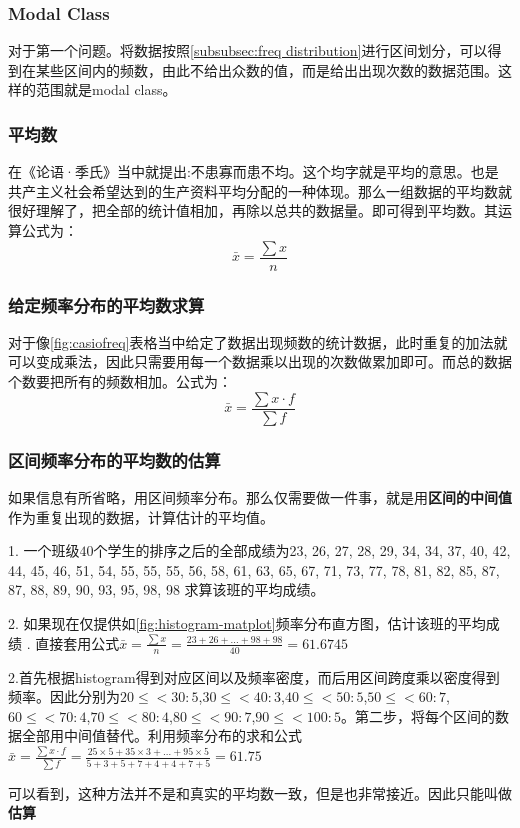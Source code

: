\subsubsection*{Modal Class}
对于第一个问题。将数据按照\ref{subsubsec:freq distribution}进行区间划分，可以得到在某些区间内的频数，由此不给出众数的值，而是给出出现次数的数据范围。这样的范围就是modal class。

\subsubsection*{平均数}
在《论语·季氏》当中就提出:不患寡而患不均。这个均字就是平均的意思。也是共产主义社会希望达到的生产资料平均分配的一种体现。那么一组数据的平均数就很好理解了，把全部的统计值相加，再除以总共的数据量。即可得到平均数。其运算公式为：
\[
    \bar{x} = \frac{\sum x}{n}
\]

\subsubsection*{给定频率分布的平均数求算}
对于像\ref{fig:casiofreq}表格当中给定了数据出现频数的统计数据，此时重复的加法就可以变成乘法，因此只需要用每一个数据乘以出现的次数做累加即可。而总的数据个数要把所有的频数相加。公式为：
\[
    \bar{x} = \frac{\sum x\cdot f}{\sum f}
\]

\subsubsection*{区间频率分布的平均数的\textbf{估算}}
如果信息有所省略，用区间频率分布。那么仅需要做一件事，就是用\textbf{区间的中间值}作为重复出现的数据，计算估计的平均值。
\begin{ExampleBox}
1. 一个班级$40$个学生的排序之后的全部成绩为23, 26, 27, 28, 29, 34, 34, 37, 40, 42, 44, 45, 46, 51, 54, 55, 55, 55, 56, 58, 61, 63, 65, 67, 71, 73, 77, 78, 81, 82, 85, 87, 87, 88, 89, 90, 93, 95, 98, 98
求算该班的平均成绩。

2. 如果现在仅提供如\ref{fig:histogram-matplot}频率分布直方图，估计该班的平均成绩
. 直接套用公式$\bar{x} = \frac{\sum x}{n} = \frac{23+26+\ldots+98+98}{40}=61.6745$

2.首先根据histogram得到对应区间以及频率密度，而后用区间跨度乘以密度得到频率。因此分别为$20\leqslant<30:5$,$30\leqslant<40:3$,$40\leqslant<50:5$,$50\leqslant<60:7$,$60\leqslant<70:4$,$70\leqslant<80:4$,$80\leqslant<90:7$,$90\leqslant<100:5$。第二步，将每个区间的数据全部用中间值替代。利用频率分布的求和公式$\bar{x} = \frac{\sum x\cdot f}{\sum f}=\frac{25\times 5 + 35\times 3+\ldots +95\times 5}{5+3+5+7+4+4+7+5}=61.75$

可以看到，这种方法并不是和真实的平均数一致，但是也非常接近。因此只能叫做\textbf{估算}
\end{ExampleBox}

